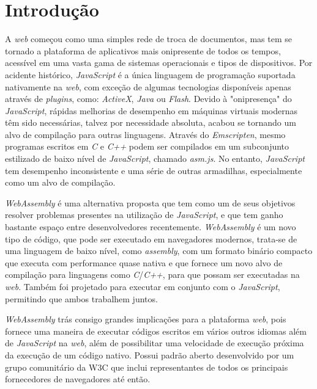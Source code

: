 \chapter{Introdução}
\label{cap:introducao}

A \textit{web} começou como uma simples rede de troca de documentos, mas tem se tornado a
plataforma de aplicativos mais onipresente de todos os tempos, acessível em uma vasta
gama de sistemas operacionais e tipos de dispositivos. Por acidente histórico,
\textit{JavaScript} é a única linguagem de programação suportada nativamente na
\textit{web}, com exceção de algumas tecnologias disponíveis apenas através de
\textit{plugins}, como: \textit{ActiveX}, \textit{Java} ou \textit{Flash}.
Devido à "onipresença" do \textit{JavaScript}, rápidas melhorias de desempenho em máquinas
virtuais modernas têm sido necessárias, talvez por necessidade absoluta, acabou se
tornando um alvo de compilação para outras linguagens. Através do \textit{Emscripten},
mesmo programas escritos em \textit{C} e \textit{C++} podem ser compilados em um
subconjunto estilizado de baixo nível de \textit{JavaScript}, chamado \textit{asm.js}.
No entanto, \textit{JavaScript} tem desempenho inconsistente e uma série de outras
armadilhas, especialmente como um alvo de compilação. \cite{wapaper}

\textit{WebAssembly} é uma alternativa proposta que tem como um de seus objetivos resolver
problemas presentes na utilização de \textit{JavaScript}, e que tem ganho bastante espaço
entre desenvolvedores recentemente. \textit{WebAssembly} é um novo tipo de código, que
pode ser executado em navegadores modernos, trata-se de uma linguagem de baixo nível, como
\textit{assembly}, com um formato binário compacto que executa com performance quase
nativa e que fornece um novo alvo de compilação para linguagens como
\textit{C}/\textit{C++}, para que possam ser executadas na \textit{web}. Também foi
projetado para executar em conjunto com o \textit{JavaScript}, permitindo que ambos
trabalhem juntos. \cite{mdn-wa}

\textit{WebAssembly} trás consigo grandes implicações para a plataforma \textit{web}, pois
fornece uma maneira de executar códigos escritos em vários outros idiomas além de
\textit{JavaScript} na \textit{web}, além de possibilitar uma velocidade de execução
próxima da execução de um código nativo. Possui padrão aberto desenvolvido por um grupo
comunitário da W3C que inclui representantes de todos os principais fornecedores de
navegadores até então.

